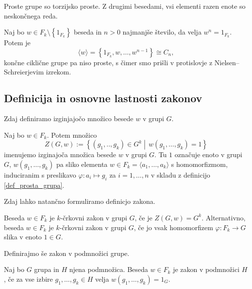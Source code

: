 \documentclass[mat1, tisk]{fmfdelo}
\numberwithin{equation}{section}  %
\begin{document}
\begin{posledica}
\label{psl_prosta_grupa_je_torzijsko_prosta}
Proste grupe so torzijsko proste. Z drugimi besedami, vsi elementi razen enote so neskončnega reda. 
\end{posledica}
\begin{dokaz}
Naj bo $w \in F_k \setminus \left\{ 1_{F_k} \right\}$ beseda in $n > 0$ najmanjše število, da velja $w^{n} = 1_{F_k}$. Potem je \begin{equation*}
\langle w \rangle = \left\{ 1_{F_{k}}, w, \ldots ,w^{n-1}\right\} \cong C_n, 
\end{equation*}  
 končne ciklične grupe pa niso proste, s čimer smo prišli v protislovje z Nielsen--Schreierjevim izrekom.  
\end{dokaz}

\subsection{Definicija in osnovne lastnosti zakonov}

Zdaj definiramo izginjajočo množico besede $w$ v grupi $G$.

\begin{definicija}
\label{def_izginjajoca_mnozica}
Naj bo $w \in  F_k$. Potem množico \begin{equation*}
Z(G, w) := \left\{ (g_1, .., g_{k}) \in  G^{k}  \middle|\, w(g_1, \ldots, g_{k}) = 1 \right\} 
\end{equation*}  
imenujemo izginajoča množica besede $w$ v grupi $G$. Tu $1$ označuje enoto v grupi $G$, $w(g_1, \ldots, g_{k})$ pa sliko elementa $w \in F_k = \langle a_{1}, \ldots , a_k \rangle$ s homomorfizmom,
induciranim s preslikavo $\varphi: a_{i} \mapsto g_{i}$ za $i = 1,\ldots, n$ v skladu z definicijo \ref{def_prosta_grupa}.  
\end{definicija}


Zdaj lahko natančno formuliramo definicjo zakona.

\begin{definicija}\label{def_zakon_formalna}
Beseda $w \in F_k$ je $k$-črkovni zakon v grupi $G$, če je $Z(G, w) = G^{k}$. Alternativno, beseda $w \in F_k$ je $k$-črkovni zakon v grupi $G$, če jo vsak homomorfizem $\varphi: F_k \to G$ slika v enoto $1 \in G$.   
\end{definicija}

Definirajmo še zakon v podmnožici grupe.
\begin{definicija}
    \label{def_zakon_v_podmnožici}
    Naj bo $G$ grupa in $H$ njena podmnožica. Beseda $w \in F_k$ je zakon v podmnožici $H$, če za vse izbire $g_1, \ldots, g_k \in H$ velja $w(g_1, \ldots, g_{k}) = 1_G$.
    \end{definicija}
    
\end{document}
